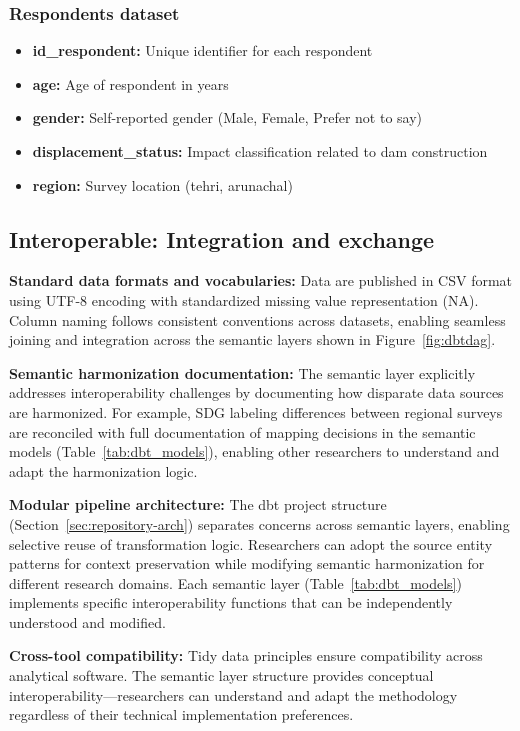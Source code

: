 \documentclass{article}
\begin{document}
\subsubsection{Respondents dataset}

\begin{itemize}
  \item \textbf{id\_respondent:} Unique identifier for each respondent
  \item \textbf{age:} Age of respondent in years
  \item \textbf{gender:} Self-reported gender (Male, Female, Prefer not to say)
  \item \textbf{displacement\_status:} Impact classification related to dam construction
  \item \textbf{region:} Survey location (tehri, arunachal)
\end{itemize}

\subsection{Interoperable: Integration and exchange}

\textbf{Standard data formats and vocabularies:} Data are published in CSV format \cite{csv_rfc} using UTF-8 encoding with standardized missing value representation (NA). Column naming follows consistent conventions across datasets, enabling seamless joining and integration across the semantic layers shown in Figure~\ref{fig:dbtdag}.

\textbf{Semantic harmonization documentation:} The semantic layer explicitly addresses interoperability challenges by documenting how disparate data sources are harmonized. For example, SDG labeling differences between regional surveys are reconciled with full documentation of mapping decisions in the semantic models (Table~\ref{tab:dbt_models}), enabling other researchers to understand and adapt the harmonization logic.

\textbf{Modular pipeline architecture:} The dbt project structure (Section~\ref{sec:repository-arch}) separates concerns across semantic layers, enabling selective reuse of transformation logic. Researchers can adopt the source entity patterns for context preservation while modifying semantic harmonization for different research domains. Each semantic layer (Table~\ref{tab:dbt_models}) implements specific interoperability functions that can be independently understood and modified.

\textbf{Cross-tool compatibility:} Tidy data principles ensure compatibility across analytical software. The semantic layer structure provides conceptual interoperability—researchers can understand and adapt the methodology regardless of their technical implementation preferences.
\end{document}
